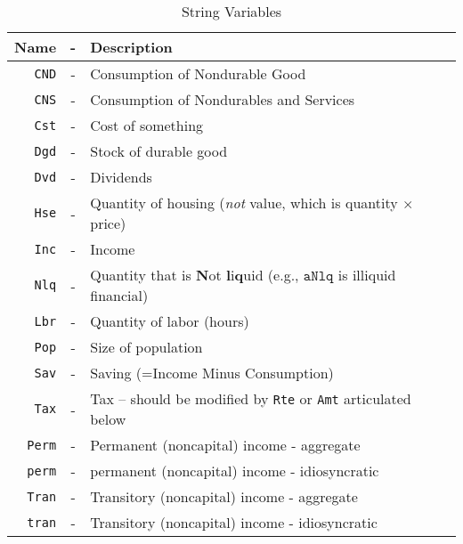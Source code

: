 \documentclass[12pt]{\econtex}
\begin{document}
\hypertarget{Standard-Variable-Names}{}
\begin{table}[ht]
  \centering
  \begin{tabular}{|rcl|}
    \hline
    Name & - & Description 
    \\ \hline
    \texttt{CND}    & - & Consumption of Nondurable Good 
    \\   \texttt{CNS}    & - & Consumption of Nondurables and Services
    \\  \texttt{Cst}    & - & Cost of something 
    \\  \texttt{Dgd}    & - & Stock of durable good
    \\  \texttt{Dvd}    & - & Dividends 
    \\  \texttt{Hse}    & - & Quantity of housing (\textit{not} value, which is quantity $\times$ price)
    \\  \texttt{Inc}    & - & Income
    \\  \texttt{Nlq}    & - & Quantity that is \textbf{N}ot \textbf{l}i\textbf{q}uid (e.g., $\mathtt{aNlq}$ is illiquid financial)
    \\  \texttt{Lbr}    & - & Quantity of labor (hours)
    \\  \texttt{Pop}    & - & Size of population
    \\  \texttt{Sav}    & - & Saving (=Income Minus Consumption)
    \\  \texttt{Tax}    & - & Tax -- should be modified by \texttt{Rte} or \texttt{Amt} articulated below
    \\  \texttt{Perm}   & - & Permanent (noncapital) income - aggregate
    \\  \texttt{perm}   & - & permanent (noncapital) income - idiosyncratic
    \\  \texttt{Tran}   & - & Transitory (noncapital) income - aggregate
    \\  \texttt{tran}   & - & Transitory (noncapital) income - idiosyncratic
    \\ \hline
  \end{tabular}
  \caption{String Variables}
  \label{table:Standard-Variable-Names}
\end{table}
\end{document}
